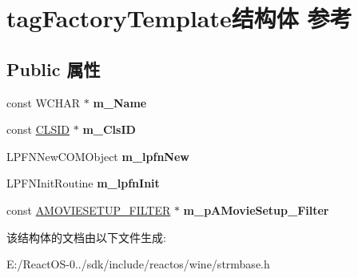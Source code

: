 \hypertarget{structtag_factory_template}{}\section{tag\+Factory\+Template结构体 参考}
\label{structtag_factory_template}
\subsection*{Public 属性}
\begin{DoxyCompactItemize}
\item 
\mbox{\label{structtag_factory_template_a851dc860510fb0a9e28808491601eb23}} 
const W\+C\+H\+AR $\ast$ {\bfseries m\+\_\+\+Name}
\item 
\mbox{\label{structtag_factory_template_af46ea9dc947e9e32f5dea556607046cc}} 
const \hyperlink{struct___i_i_d}{C\+L\+S\+ID} $\ast$ {\bfseries m\+\_\+\+Cls\+ID}
\item 
\mbox{\label{structtag_factory_template_ae9b86c9a0bc1e3f640caa841f7a9d3ea}} 
L\+P\+F\+N\+New\+C\+O\+M\+Object {\bfseries m\+\_\+lpfn\+New}
\item 
\mbox{\label{structtag_factory_template_aa21b99f8b70a65c299057ddcd8f45079}} 
L\+P\+F\+N\+Init\+Routine {\bfseries m\+\_\+lpfn\+Init}
\item 
\mbox{\label{structtag_factory_template_a21fc19673696cffab9a7af2191b532a7}} 
const \hyperlink{struct_a_m_o_v_i_e_s_e_t_u_p___f_i_l_t_e_r}{A\+M\+O\+V\+I\+E\+S\+E\+T\+U\+P\+\_\+\+F\+I\+L\+T\+ER} $\ast$ {\bfseries m\+\_\+p\+A\+Movie\+Setup\+\_\+\+Filter}
\end{DoxyCompactItemize}


该结构体的文档由以下文件生成\+:\begin{DoxyCompactItemize}
\item 
E\+:/\+React\+O\+S-\/0../sdk/include/reactos/wine/strmbase.\+h\end{DoxyCompactItemize}
